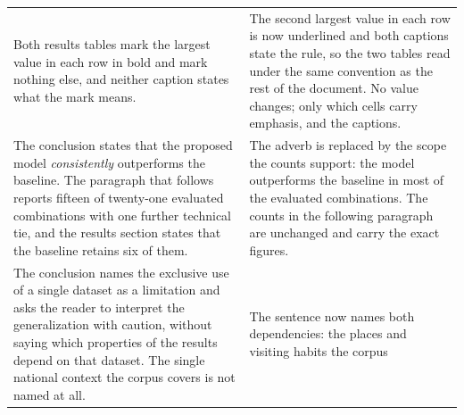 \begin{table}[htb]
\begin{tabular}{@{}p{}p{}@{}}
Both results tables mark the largest value in each row in bold and mark nothing else, and
neither caption states what the mark means. &
The second largest value in each row is now underlined and both captions state the rule, so
the two tables read under the same convention as the rest of the document. No value
changes; only which cells carry emphasis, and the captions. \\
\addlinespace
The conclusion states that the proposed model \emph{consistently} outperforms the
baseline. The paragraph that follows reports fifteen of twenty-one evaluated combinations
with one further technical tie, and the results section states that the baseline retains
six of them. &
The adverb is replaced by the scope the counts support: the model outperforms the baseline
in most of the evaluated combinations. The counts in the following paragraph are unchanged
and carry the exact figures. \\
\addlinespace
The conclusion names the exclusive use of a single dataset as a limitation and asks the
reader to interpret the generalization with caution, without saying which properties of
the results depend on that dataset. The single national context the corpus covers is not
named at all. &
The sentence now names both dependencies: the places and visiting habits the corpus

\end{tabular}
\end{table}
